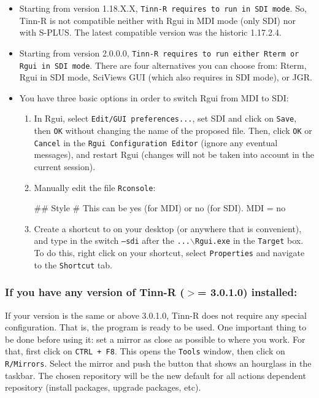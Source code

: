 \begin{itemize}
  \item Starting from version 1.18.X.X, \texttt{Tinn-R requires
      \RR{} to run in SDI mode}. So, Tinn-R is not compatible neither
    with Rgui in MDI mode (only SDI) nor with S-PLUS. The
    latest compatible version was the historic 1.17.2.4.
  \item Starting from version 2.0.0.0, \texttt{Tinn-R requires
      \RR{} to run either Rterm or Rgui in SDI mode}. There are four
    alternatives you can choose from: Rterm, Rgui in SDI mode,
    SciViews GUI (which  also requires \RR{} in SDI mode), or JGR.
  \item You have three basic options in order to switch Rgui from
    MDI to SDI:
    \begin{enumerate}
      \item In Rgui, select \texttt{Edit/GUI preferences...},
        set SDI and click on \texttt{Save}, then \texttt{OK}
        without changing the name of the proposed file. Then,
        click \texttt{OK} or \texttt{Cancel} in the
        \texttt{Rgui Configuration Editor} (ignore any eventual
        messages), and restart Rgui (changes will not be taken
        into account in the current session).
      \item Manually edit the file \texttt{Rconsole}:
        \begin{Scode}
          ## Style
          # This can be yes (for MDI) or no (for SDI).
          MDI = no
        \end{Scode}
      \item Create a shortcut to \RR{} on your desktop (or anywhere that is convenient),
        and type in the switch \texttt{--sdi} after the \texttt{...$\backslash$Rgui.exe}
        in the \texttt{Target} box. To do this, right click on your shortcut, select
        \texttt{Properties} and navigate to the \texttt{Shortcut} tab.
    \end{enumerate}
\end{itemize}


\subsubsection{If you have any version of Tinn-R ($>$= 3.0.1.0) installed:}

If your version is the same or above 3.0.1.0, Tinn-R does not require any special configuration.
That is, the program is ready to be used. One important thing to be done before using it:
set a \RR{} mirror as close as possible to where you work. For that, first click on \texttt{CTRL + F8}.
This opens the \texttt{Tools} window, then click on \texttt{R/Mirrors}.
Select the \RR{} mirror and push the button that shows an hourglass in the taskbar.
The chosen repository will be the new default for all actions dependent repository
(install packages, upgrade packages, etc).


